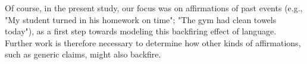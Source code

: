 \documentclass[10pt,letterpaper]{article}
\begin{document}
Of course, in the present study, our focus was on affirmations of past events (e.g., "My student turned in his homework on time"; "The gym had clean towels today"), as a first step towards modeling this backfiring effect of language.  Further work is therefore necessary to determine how other kinds of affirmations, such as generic claims, might also backfire.





\setlength{\bibleftmargin}{.125in}
\setlength{\bibindent}{-\bibleftmargin}


\end{document}
